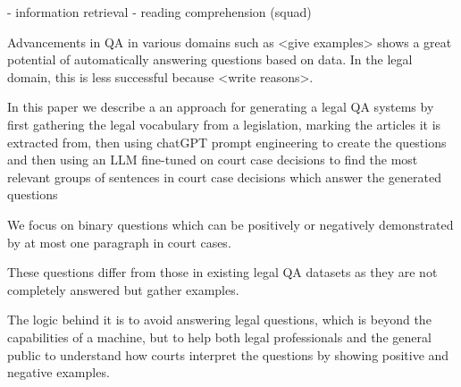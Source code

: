 - information retrieval
- reading comprehension (squad)

Advancements in QA in various domains such as <give examples> shows a great potential of automatically answering questions based on data. In the legal domain, this is less successful because <write reasons>.

In this paper we describe a an approach for generating a legal QA systems by first gathering the legal vocabulary from a legislation, marking the articles it is extracted from, then using chatGPT prompt engineering to create the questions and then using an LLM fine-tuned on court case decisions to find the most relevant groups of sentences in court case decisions which answer the generated questions

We focus on binary questions which can be positively or negatively demonstrated by at most one paragraph in court cases. 

These questions differ from those in existing legal QA datasets as they are not completely answered but gather examples.

The logic behind it is to avoid answering legal questions, which is beyond the capabilities of a machine, but to help both legal professionals and the general public to understand how courts interpret the questions by showing positive and negative examples.

